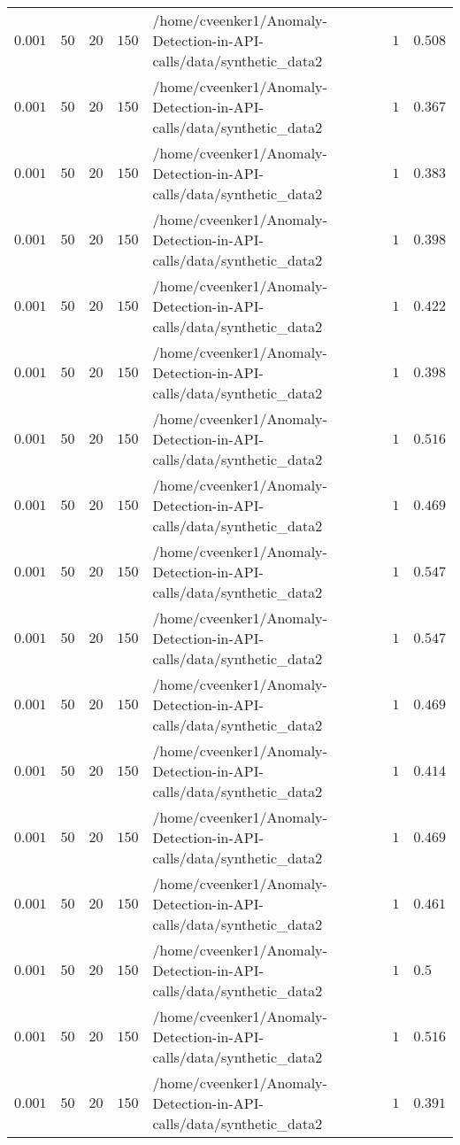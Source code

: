 \begin{table}[tbp]
\begin{tabular}{lllllll}
$0.001$ & $50$ & $20$ & $150$ & /home/cveenker1/Anomaly-Detection-in-API-calls/data/synthetic\_data2 & $1$ & $0.508$ \\
$0.001$ & $50$ & $20$ & $150$ & /home/cveenker1/Anomaly-Detection-in-API-calls/data/synthetic\_data2 & $1$ & $0.367$ \\
$0.001$ & $50$ & $20$ & $150$ & /home/cveenker1/Anomaly-Detection-in-API-calls/data/synthetic\_data2 & $1$ & $0.383$ \\
$0.001$ & $50$ & $20$ & $150$ & /home/cveenker1/Anomaly-Detection-in-API-calls/data/synthetic\_data2 & $1$ & $0.398$ \\
$0.001$ & $50$ & $20$ & $150$ & /home/cveenker1/Anomaly-Detection-in-API-calls/data/synthetic\_data2 & $1$ & $0.422$ \\
$0.001$ & $50$ & $20$ & $150$ & /home/cveenker1/Anomaly-Detection-in-API-calls/data/synthetic\_data2 & $1$ & $0.398$ \\
$0.001$ & $50$ & $20$ & $150$ & /home/cveenker1/Anomaly-Detection-in-API-calls/data/synthetic\_data2 & $1$ & $0.516$ \\
$0.001$ & $50$ & $20$ & $150$ & /home/cveenker1/Anomaly-Detection-in-API-calls/data/synthetic\_data2 & $1$ & $0.469$ \\
$0.001$ & $50$ & $20$ & $150$ & /home/cveenker1/Anomaly-Detection-in-API-calls/data/synthetic\_data2 & $1$ & $0.547$ \\
$0.001$ & $50$ & $20$ & $150$ & /home/cveenker1/Anomaly-Detection-in-API-calls/data/synthetic\_data2 & $1$ & $0.547$ \\
$0.001$ & $50$ & $20$ & $150$ & /home/cveenker1/Anomaly-Detection-in-API-calls/data/synthetic\_data2 & $1$ & $0.469$ \\
$0.001$ & $50$ & $20$ & $150$ & /home/cveenker1/Anomaly-Detection-in-API-calls/data/synthetic\_data2 & $1$ & $0.414$ \\
$0.001$ & $50$ & $20$ & $150$ & /home/cveenker1/Anomaly-Detection-in-API-calls/data/synthetic\_data2 & $1$ & $0.469$ \\
$0.001$ & $50$ & $20$ & $150$ & /home/cveenker1/Anomaly-Detection-in-API-calls/data/synthetic\_data2 & $1$ & $0.461$ \\
$0.001$ & $50$ & $20$ & $150$ & /home/cveenker1/Anomaly-Detection-in-API-calls/data/synthetic\_data2 & $1$ & $0.5$ \\
$0.001$ & $50$ & $20$ & $150$ & /home/cveenker1/Anomaly-Detection-in-API-calls/data/synthetic\_data2 & $1$ & $0.516$ \\
$0.001$ & $50$ & $20$ & $150$ & /home/cveenker1/Anomaly-Detection-in-API-calls/data/synthetic\_data2 & $1$ & $0.391$ \\

\end{tabular}
\end{table}

